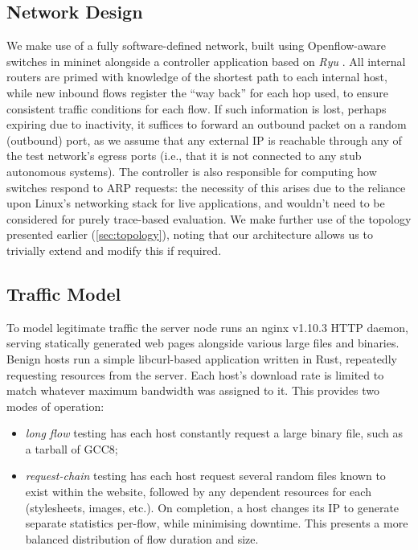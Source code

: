 \documentclass[conference, letterpaper, 10pt, times]{IEEEtran}
\begin{document}
\subsection{Network Design}
We make use of a fully software-defined network, built using Openflow-aware switches in mininet alongside a controller application based on \emph{Ryu} \cite{ryu}.
All internal routers are primed with knowledge of the shortest path to each internal host, while new inbound flows register the ``way back'' for each hop used, to ensure consistent traffic conditions for each flow.
If such information is lost, perhaps expiring due to inactivity, it suffices to forward an outbound packet on a random (outbound) port, as we assume that any external IP is reachable through any of the test network's egress ports (i.e., that it is not connected to any stub autonomous systems).
The controller is also responsible for computing how switches respond to ARP requests: the necessity of this arises due to the reliance upon Linux's networking stack for live applications, and wouldn't need to be considered for purely trace-based evaluation.
We make further use of the topology presented earlier (\cref{sec:topology}), noting that our architecture allows us to trivially extend and modify this if required.

\subsection{Traffic Model}
To model legitimate traffic the server node runs an nginx v1.10.3 HTTP daemon, serving statically generated web pages alongside various large files and binaries.
Benign hosts run a simple libcurl-based application written in Rust, repeatedly requesting resources from the server.
Each host's download rate is limited to match whatever maximum bandwidth was assigned to it.
This provides two modes of operation:
\begin{itemize}
	\item \emph{long flow} testing has each host constantly request a large binary file, such as a tarball of GCC8;
	\item \emph{request-chain} testing has each host request several random files known to exist within the website, followed by any dependent resources for each (stylesheets, images, etc.). On completion, a host changes its IP to generate separate statistics per-flow, while minimising downtime. This presents a more balanced distribution of flow duration and size.
\end{itemize}
\end{document}
